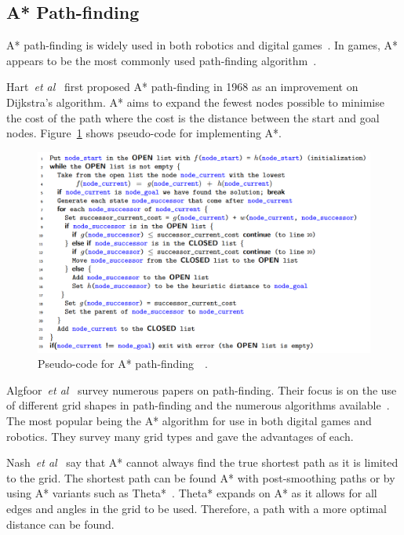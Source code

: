 \documentclass[journal]{IEEEtran}
\begin{document}
	\subsection{A* Path-finding} \label{A*PF}
	A* path-finding is widely used in both robotics and digital games~\cite{Algfoor2015}. In games, A* appears to be the most commonly used path-finding algorithm~\cite{Algfoor2015}.
	
	Hart~\textit{et al}~\cite{Hart1968} first proposed A* path-finding in 1968 as an improvement on Dijkstra's algorithm. A* aims to expand the fewest nodes possible to minimise the cost of the path where the cost is the distance between the start and goal nodes. Figure~\ref{A*Pseudo} shows pseudo-code for implementing A*. 
	
	\begin{figure}[h]
		\includegraphics[width=1.0\linewidth]{APseudocode.png}
		\caption{Pseudo-code for A* path-finding~\cite{Hart1968}~\cite{pseudocode:A*}.}
		\label{A*Pseudo}
	\end{figure} 
	
	Algfoor~\textit{et al}~\cite{Algfoor2015} survey numerous papers on path-finding. Their focus is on the use of different grid shapes in path-finding and the numerous algorithms available~\cite{Algfoor2015}. The most popular being the A* algorithm for use in both digital games and robotics. They survey many grid types and gave the advantages of each. 
	
	Nash~\textit{et al}~\cite{Nash2007} say that A* cannot always find the true shortest path as it is limited to the grid. The shortest path can be found A* with post-smoothing paths or by using A* variants such as Theta*~\cite{Nash2007, Firmansyah2016}. Theta* expands on A* as it allows for all edges and angles in the grid to be used. Therefore, a path with a more optimal distance can be found.
	
\end{document}
